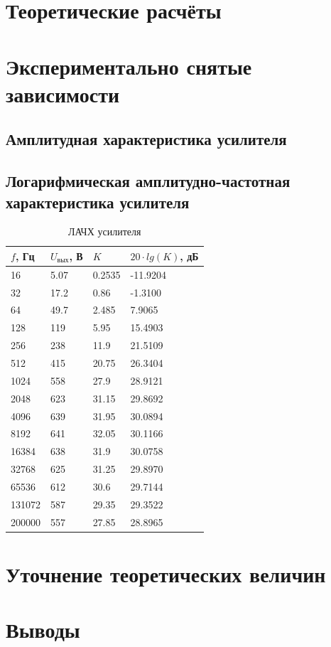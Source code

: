 \section{Теоретические расчёты}

\section{Экспериментально снятые зависимости}

\subsection{Амплитудная характеристика усилителя}

\subsection{Логарифмическая амплитудно-частотная характеристика усилителя}

\begin{table}[H]
	\begin{center}
	\caption{ЛАЧХ усилителя}
	\def\arraystretch{1.5}
		\begin{tabularx}{\textwidth}{|X|X|X|X|}
			\hline
			$f$, Гц & $U_\text{вых}$, В & $K$ & $20 \cdot lg(K)$, дБ\\\hline
			16 & 5.07 & 0.2535 & -11.9204\\\hline	
			32 & 17.2 & 0.86 & -1.3100\\\hline	
			64 & 49.7 & 2.485 & 7.9065\\\hline	
			128 & 119 & 5.95 & 15.4903\\\hline	
			256 & 238 & 11.9 & 21.5109\\\hline	
			512 & 415 & 20.75 & 26.3404\\\hline	
			1024 & 558 & 27.9 & 28.9121\\\hline	
			2048 & 623 & 31.15 & 29.8692\\\hline	
			4096 & 639 & 31.95 & 30.0894\\\hline	
			8192 & 641 & 32.05 & 30.1166\\\hline	
			16384 & 638 & 31.9 & 30.0758\\\hline	
			32768 & 625 & 31.25 & 29.8970\\\hline	
			65536 & 612 & 30.6 & 29.7144\\\hline	
			131072 & 587 & 29.35 & 29.3522\\\hline	
			200000 & 557 & 27.85 & 28.8965\\\hline	
		\end{tabularx}
		\label{tabular:2}
	\end{center}
\end{table}

\section{Уточнение теоретических величин}

\section{Выводы}


